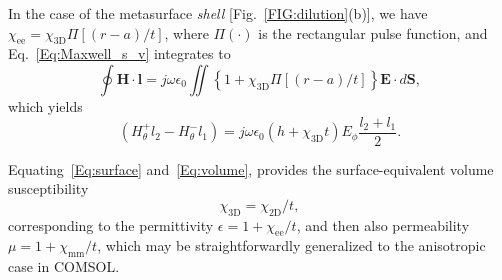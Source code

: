 \documentclass[journal,transaction]{IEEEtran}
\newcommand{\figref}{Fig.~\ref}
\newcommand{\ve}[1]{\mathbf{#1}}
\begin{document}
In the case of the metasurface \emph{shell} [\figref{FIG:dilution}(b)], we have $\chi_\text{ee}=\chi_\text{3D}\Pi[(r-a)/t]$, where $\Pi(\cdot)$ is the rectangular pulse function, and Eq.~\eqref{Eq:Maxwell_s_v} integrates to
%
\begin{equation}\label{Eq:Maxwellintegration2}
\oint\ve{H}\cdot\ve{l}=j\omega\epsilon_0\iint\left\{1+\chi_\text{3D}\Pi[(r-a)/t]\right\}\ve{E}\cdot d\ve{S},
\end{equation}
%
which yields
%
\begin{equation}\label{Eq:volume}
  (H_\theta^+l_2-H_\theta^-l_1)=j\omega\epsilon_0(h+\chi_\text{3D}t)E_\phi\frac{l_2+l_1}{2}.
\end{equation}

Equating~\eqref{Eq:surface} and~\eqref{Eq:volume}, provides the surface-equivalent volume susceptibility
%
\begin{equation}\label{Eq:chi_sur_vol}
\chi_\text{3D}=\chi_\text{2D}/t,
\end{equation}
%
corresponding to the permittivity $\epsilon=1+\chi_\text{ee}/t$, and then also permeability $\mu=1+\chi_\text{mm}/t$, which may be straightforwardly generalized to the anisotropic case in COMSOL.
\end{document}
